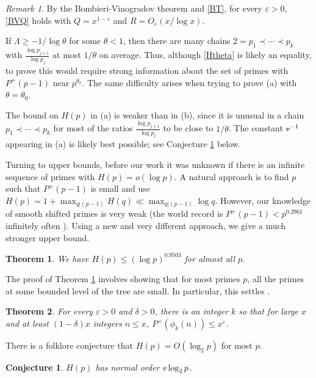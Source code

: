 \documentclass[12pt]{amsart}
\theoremstyle{remark}
\newtheorem{remark}{Remark}
\theoremstyle{plain}
\newtheorem{conj}{Conjecture}
\newtheorem{thm}{Theorem}
\numberwithin{equation}{section}
\renewcommand{\th}{\ensuremath{\theta}}
\newcommand{\eps}{\ensuremath{\varepsilon}}
\renewcommand{\(}{\left(}
\renewcommand{\)}{\right)}
\newcommand{\er}{{\rm e}}  %
\renewcommand{\le}{\leqslant}
\renewcommand{\ge}{\geqslant}
\begin{document}
\begin{remark}
By the Bombieri-Vinogradov theorem and \eqref{BT}, for every $\eps>0$,
\eqref{BVQ} holds with $Q=x^{1-\eps}$ and $R=O_\eps(x/\log x)$.

If $\Lambda  \ge -1/\log \th$ for some $\th<1$, then there are
many chains $2=p_1 \prec \cdots \prec p_k$
with $\frac{\log p_{j+1}}{\log p_j}$ at most $1/\th$ on average.
Thus, although \eqref{Htheta} is likely an equality,
to prove this would require strong information about the set of
primes with $P^+(p-1)$ near $p^{\th_0}$.  The same difficulty
arises when trying to prove (a) with $\th=\th_0$.

The bound on $H(p)$ in (a) is weaker than in (b), since it is unusual in a chain
$p_1\prec \cdots \prec p_k$ for most of  the ratios $\frac{\log p_{j+1}}{\log p_j}$
to be close to $1/\th$.  The constant $\er^{-1}$ appearing in (a) is likely
best possible; see Conjecture \ref{Dpnormal1} below.
\end{remark}

Turning to upper bounds, before our work it was unknown if there 
is an infinite sequence of primes with $H(p)=o(\log p)$.
A natural  approach is to find $p$ such that 
$P^+(p-1)$ is small and use $H(p)=1+\max_{q|(p-1)} H(q)\ll \max_{q|(p-1)}
\log q$.  
However, our knowledge of smooth shifted primes is very weak 
(the world record is $P^+(p-1)<p^{0.2961}$ infinitely often \cite{BH}).
Using a new
and very different approach, we give a much stronger upper bound.

\begin{thm}\label{Prattupper}
We have $H(p) \le (\log p)^{0.9503}$ for almost all $p$.
\end{thm}

The proof of Theorem \ref{Prattupper} involves showing that for most primes
$p$, all the primes at some bounded level of the tree are small.
In particular, this settles \cite[Conjecture 2]{EGPS}.  

\begin{thm}\label{EGPSconj}
For every $\eps>0$ and $\delta>0$, there is an integer $k$ so that for large $x$
and at least $(1-\delta)x$ integers $n\le x$, $P^+(\phi_k(n))\le x^{\eps}$.
\end{thm}

There is a folklore conjecture that $H(p)=O(\log_2 p)$ for most $p$. 

\begin{conj}\label{Dpnormal1}
$H(p)$ has normal order $\er \log_2 p$. 
\end{conj}
\end{document}
